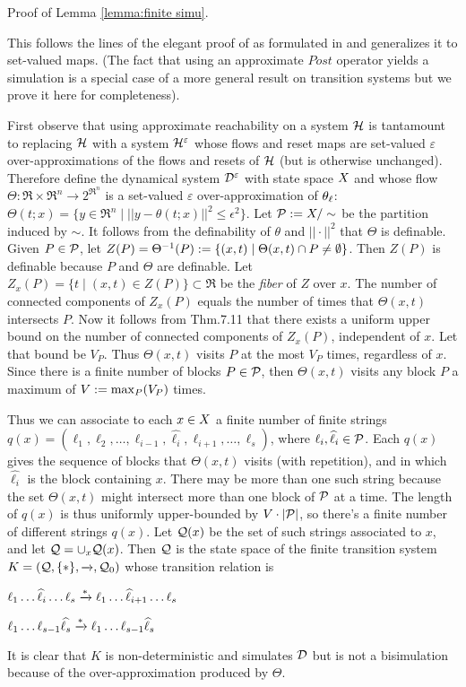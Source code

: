 Proof of Lemma \ref{lemma:finite simu}.
\begin{prf}
	This follows the lines of the elegant proof of \cite{BrihayeM05_ominimal} as formulated in \cite{tabuada} and generalizes it to set-valued maps.
	(The fact that using an approximate $Post$ operator yields a simulation is a special case of a more general result on transition systems but we prove it here for completeness).
	
	First observe that using approximate reachability on a system $\mathcal{H}$ is tantamount to replacing $\mathcal{H}$ with a system $\mathcal{H}^\varepsilon$ whose flows and reset maps are set-valued $\varepsilon$ over-approximations of the flows and resets of $\mathcal{H}$ (but is otherwise unchanged).
	Therefore define the dynamical system $\mathcal{D}^\varepsilon$ with state space $X$ and whose flow $\Theta: \Re \times \Re^n \rightarrow 2^{\Re^n}$ is a set-valued $\varepsilon$ over-approximation of $\theta_\ell$:
	$\Theta(t;x) = \{y \in \Re^n \;|\; ||y-\theta(t;x)||^2 \leq \epsilon^2\}$.	
	Let $\mathcal{P} := X/\sim$ be the partition induced by $\sim$.
	It follows from the definability of $\theta$ and $||\cdot||^2$ that $\Theta$ is definable. 
	Given $P \in \mathcal{P}$, let $Z(P) = \Theta^{-1}(P) := \{(x,t) \;|\; \Theta(x,t) \cap P \neq \emptyset\}$.
	Then $Z(P)$ is definable because $P$ and $\Theta$ are definable.
	Let $Z_x(P) = \{t \;|\; (x,t) \in Z(P)\} \subset \Re$ be the \emph{fiber} of $Z$ over $x$.
	The number of connected components of $Z_x(P)$ equals the number of times that $\Theta(x,t)$ intersects $P$.
	Now it follows from \cite{tabuada} Thm.7.11 that there exists a uniform upper bound on the number of connected components of $Z_x(P)$, independent of $x$.
	Let that bound be $V_P$.
	Thus $\Theta(x,t)$ visits $P$ at the most $V_P$ times, regardless of $x$.
	Since there is a finite number of blocks $P \in \mathcal{P}$, then $\Theta(x,t)$ visits any block $P$ a maximum of $V := \max_P(V_P)$ times.%
	
	Thus we can associate to each $x\in X$ a finite number of finite strings $q(x) = (\ell_1,\ell_2,\ldots,\ell_{i-1},\widehat{\ell_i},\ell_{i+1},\ldots,\ell_s)$, where $\ell_i,\widehat{\ell}_i \in \mathcal{P}$.
	Each $q(x)$ gives the sequence of blocks that $\Theta(x,t)$ visits (with repetition), and in which $\widehat{\ell_i}$ is the block containing $x$.
	There may be more than one such string because the set $\Theta(x,t)$ might intersect more than one block of $\mathcal{P}$ at a time.		
	The length of $q(x)$ is thus uniformly upper-bounded by $V\cdot |\mathcal{P}|$, so there's a finite number of different strings $q(x)$. 
	Let $\mathcal{Q}(x)$ be the set of such strings associated to $x$, and let $\mathcal{Q} = \cup_x \mathcal{Q}(x)$.
	Then $\mathcal{Q}$ is the state space of the finite transition system $K = (\mathcal{Q},\{*\},\xrightarrow{},\mathcal{Q}_0)$ whose transition relation is 
	\begin{compactitem}
		\item $\ell_1\ldots\widehat{\ell}_i\ldots\ell_s \xrightarrow{*} \ell_1\ldots\widehat{\ell}_{i+1}\ldots\ell_s$
		\item $\ell_1\ldots\ell_{s-1} \widehat{\ell_s} \xrightarrow{*} \ell_1\ldots\ell_{s-1} \widehat{\ell}_s$
	\end{compactitem}

	It is clear that $K$ is non-deterministic and simulates $\mathcal{D}$ but is not a bisimulation because of the over-approximation produced by $\Theta$.	 
\end{prf} 